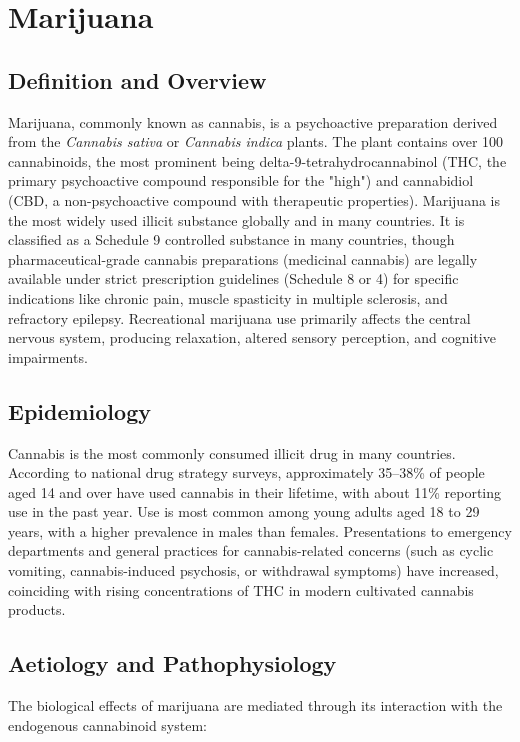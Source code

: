 \chapter{Marijuana}

\section*{Definition and Overview}
Marijuana, commonly known as cannabis, is a psychoactive preparation derived from the \textit{Cannabis sativa} or \textit{Cannabis indica} plants. The plant contains over 100 cannabinoids, the most prominent being delta-9-tetrahydrocannabinol (THC, the primary psychoactive compound responsible for the "high") and cannabidiol (CBD, a non-psychoactive compound with therapeutic properties). Marijuana is the most widely used illicit substance globally and in many countries. It is classified as a Schedule 9 controlled substance in many countries, though pharmaceutical-grade cannabis preparations (medicinal cannabis) are legally available under strict prescription guidelines (Schedule 8 or 4) for specific indications like chronic pain, muscle spasticity in multiple sclerosis, and refractory epilepsy. Recreational marijuana use primarily affects the central nervous system, producing relaxation, altered sensory perception, and cognitive impairments.

\section*{Epidemiology}
Cannabis is the most commonly consumed illicit drug in many countries. According to national drug strategy surveys, approximately 35--38\% of people aged 14 and over have used cannabis in their lifetime, with about 11\% reporting use in the past year. Use is most common among young adults aged 18 to 29 years, with a higher prevalence in males than females. Presentations to emergency departments and general practices for cannabis-related concerns (such as cyclic vomiting, cannabis-induced psychosis, or withdrawal symptoms) have increased, coinciding with rising concentrations of THC in modern cultivated cannabis products.

\section*{Aetiology and Pathophysiology}
The biological effects of marijuana are mediated through its interaction with the endogenous cannabinoid system:

